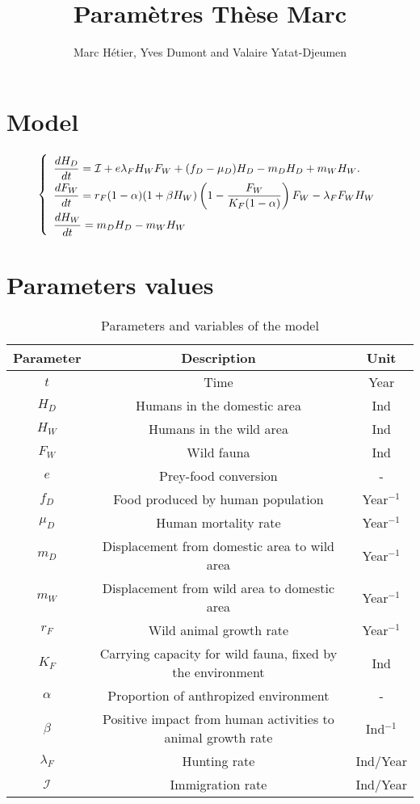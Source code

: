 \documentclass{article}
\title{Paramètres Thèse Marc}
\author{Marc Hétier, Yves Dumont  and Valaire Yatat-Djeumen}
\newcommand{\lfw}{\lambda_{F}}
\newcommand{\cI}{\mathcal{I}}
\begin{document}
\maketitle
\section{Model}

\begin{equation}
\def\arraystretch{2}
\left\{ 
\begin{array}{l}
\dfrac{dH_D}{dt}= \cI + e\lfw H_W F_W + (f_D - \mu_D) H_D - m_D H_D + m_W H_W. \\
\dfrac{dF_W}{dt} = r_F(1- \alpha) (1+ \beta H_W) \left(1 - \dfrac{F_W}{K_F(1-\alpha)} \right) F_W - \lfw F_W H_W \\
\dfrac{dH_W}{dt}= m_D H_D - m_W H_W 
\end{array} \right.
\label{equationsHDFWHW}
\end{equation}



\section{Parameters values}
\begin{table}[ht]
\begin{tabular}{|c|c|c|}
\hline 
Parameter & Description & Unit \\ 
\hline \hline
$t$ & Time & Year \\
\hline
$H_D$ & Humans in the domestic area & Ind \\
$H_W$ & Humans in the wild area & Ind \\
$F_W$ & Wild fauna & Ind \\
\hline
$e$ & Prey-food conversion & - \\
$f_D$ & Food produced by human population & Year$^{-1}$ \\
$\mu_D$ & Human mortality rate  & Year$^{-1}$ \\
$m_D$ & Displacement from domestic area to wild area & Year$^{-1}$ \\
$m_W$ & Displacement from wild area to domestic area & Year$^{-1}$ \\
$r_F$ & Wild animal growth rate & Year$^{-1}$ \\
$K_F$ & Carrying capacity for wild fauna, fixed by the environment& Ind \\
$\alpha$ & Proportion of anthropized environment & - \\
$\beta$ & Positive impact from human activities to animal growth rate & Ind$^{-1}$  \\
$\lfw$ & Hunting rate & Ind/Year\\
$\mathcal{I}$ & Immigration rate &Ind/Year\\
\hline
\end{tabular}
\caption{Parameters and variables of the model}
\end{table}
\end{document}
